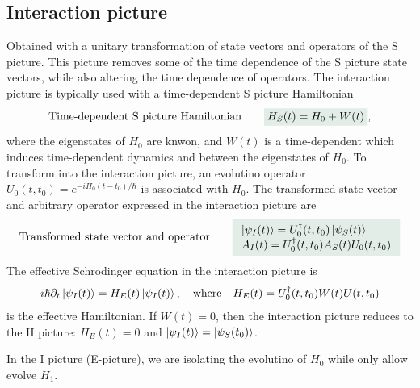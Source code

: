 \subsection{Interaction picture}
Obtained with a unitary transformation of state vectors and operators of the S picture.
This picture removes some of the time dependence of the S picture state vectors, while also altering the time dependence of operators. 
The interaction picture is typically used with a time-dependent S picture Hamiltonian 
\begin{align}
    \text{Time-dependent S picture Hamiltonian}\qquad\highlight{H_S(t)=H_0+W(t)},
\end{align}
where the eigenstates of $H_0$ are knwon, and $W(t)$ is a time-dependent  which induces time-dependent dynamics and 
between the eigenstates of $H_0$. To transform into the interaction picture, an evolutino operator $U_0(t,t_0)=e^{-iH_0(t-t_0)/\hbar}$ is associated with $H_0$.
The transformed state vector and arbitrary operator expressed in the interaction picture are 
\begin{align}
    \text{Transformed state vector and operator}\qquad\highlight{\begin{array}{l}
        \ket{\psi_I(t)}=U_0^\dagger(t,t_0)\ket{\psi_S(t)}\\
        A_I(t)=U^\dagger_0(t,t_0)A_S(t)U_0(t,t_0)
    \end{array}}
\end{align}
The effective Schrodinger equation in the interaction picture is 
\begin{align}
    i\hbar\partial_t\left|\psi_I(t)\right\rangle=H_E(t)\left|\psi_I(t)\right\rangle,\quad\text{where}\quad H_E(t)=U^\dagger_0(t,t_0)W(t)U(t,t_0)
\end{align}
is the effective Hamiltonian. If $W(t)=0$, then the interaction picture reduces to the H picture: $H_E(t)=0$ and $\left|\psi_I(t)\right\rangle=\left|\psi_S(t_0)\right\rangle$.
\begin{emphasizer}
    In the I picture (E-picture), we are isolating the evolutino of $H_0$ while only allow evolve $H_1$.
\end{emphasizer}
